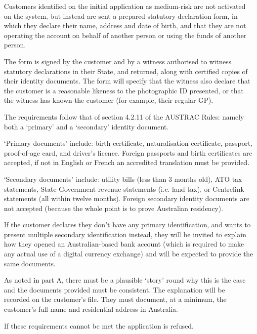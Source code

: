 \documentclass[12pt]{report}
\begin{document}
Customers identified on the initial application as medium-risk are not activated on the system, but instead are
sent a prepared statutory declaration form, in which they declare their name, address and date of birth, and
that they are not operating the account on behalf of another person or using the funds of another person.

The form is signed by the customer and by a witness authorised to witness statutory declarations in their State,
and returned, along with certified copies of their identity documents. The form will specify that the
witness also declare that the customer is a reasonable likeness to the photographic ID presented, or
that the witness has known the customer (for example, their regular GP).

The requirements follow that of section 4.2.11 of the AUSTRAC Rules: namely both a `primary' and a `secondary' identity
document.

`Primary documents' include: birth certificate, naturalisation certificate, passport, proof-of-age card,
and driver's licence. Foreign passports and birth certificates are accepted, if not in English or French
an accredited translation must be provided.

`Secondary documents' include: utility bills (less than 3 months old), ATO tax statements,
State Government revenue statements (i.e. land tax), or Centrelink statements (all within twelve months). Foreign
secondary identity documents are not accepted (because the whole point is to prove Australian residency).

If the customer declares they don't have any primary identification, and wants to present multiple secondary identification
instead, they will be invited to explain how they opened an Australian-based bank account (which is required to
make any actual use of a digital currency exchange) and will be expected to provide the same documents.

As noted in part A, there must be a plausible `story' round why this is the case and the documents provided must
be consistent. The explanation will be recorded on the customer's file.
They must document, at a minimum, the customer's full name and residential address in Australia.

If these requirements cannot be met the application is refused.
\end{document}
